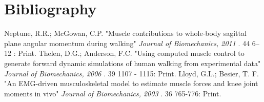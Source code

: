



\section{Bibliography}

\begin{thebibliography}{99}
 Neptune, R.R.; McGowan, C.P. 
	"Muscle contributions to whole-body sagittal plane angular momentum during walking" 
	{ \em Journal of Biomechanics, 2011 }. 44 6–12 : Print.
 Thelen, D.G.; Anderson, F.C. "Using computed muscle control to generate forward dynamic simulations of human walking from experimental data"
	{ \em Journal of Biomechanics, 2006 }. 39 1107 - 1115: Print.
 Lloyd, G.L.; Besier, T. F.
	"An EMG-driven musculoskeletal model to estimate muscle forces and knee joint moments in vivo"
	{ \em  Journal of Biomechanics, 2003 }. 36 765-776: Print.
\end{thebibliography}

